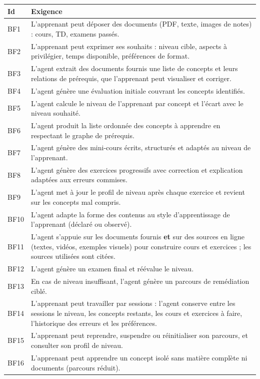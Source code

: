 \documentclass[11pt,a4paper]{article}
\begin{document}
\begin{center}
\renewcommand{\arraystretch}{1.25}
\begin{tabularx}{\textwidth}{@{}l X@{}}
\toprule
\textbf{Id} & \textbf{Exigence}\\
\midrule
BF1 & L'apprenant peut déposer des documents (PDF, texte, images de notes) : cours, TD, examens passés.\\
BF2 & L'apprenant peut exprimer ses souhaits : niveau cible, aspects à privilégier, temps disponible, préférences de format.\\
BF3 & L'agent extrait des documents fournis une liste de concepts et leurs relations de prérequis, que l'apprenant peut visualiser et corriger.\\
BF4 & L'agent génère une évaluation initiale couvrant les concepts identifiés.\\
BF5 & L'agent calcule le niveau de l'apprenant par concept et l'écart avec le niveau souhaité.\\
BF6 & L'agent produit la liste ordonnée des concepts à apprendre en respectant le graphe de prérequis.\\
BF7 & L'agent génère des mini-cours écrits, structurés et adaptés au niveau de l'apprenant.\\
BF8 & L'agent génère des exercices progressifs avec correction et explication adaptées aux erreurs commises.\\
BF9 & L'agent met à jour le profil de niveau après chaque exercice et revient sur les concepts mal compris.\\
BF10 & L'agent adapte la forme des contenus au style d'apprentissage de l'apprenant (déclaré ou observé).\\
BF11 & L'agent s'appuie sur les documents fournis \textbf{et} sur des sources en ligne (textes, vidéos, exemples visuels) pour construire cours et exercices ; les sources utilisées sont citées.\\
BF12 & L'agent génère un examen final et réévalue le niveau.\\
BF13 & En cas de niveau insuffisant, l'agent génère un parcours de remédiation ciblé.\\
BF14 & L'apprenant peut travailler par sessions : l'agent conserve entre les sessions le niveau, les concepts restants, les cours et exercices à faire, l'historique des erreurs et les préférences.\\
BF15 & L'apprenant peut reprendre, suspendre ou réinitialiser son parcours, et consulter son profil de niveau.\\
BF16 & L'apprenant peut apprendre un concept isolé sans matière complète ni documents (parcours réduit).\\
\bottomrule
\end{tabularx}
\end{center}
\end{document}
